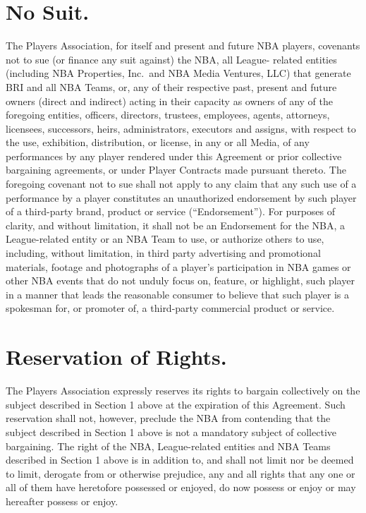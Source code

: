 \documentclass[
]{book}
\begin{document}
\hypertarget{no-suit.}{%
\section{No Suit.}\label{no-suit.}}

The Players Association, for itself and present and future NBA players, covenants not to sue (or finance any suit against) the NBA, all League- related entities (including NBA Properties, Inc.~and NBA Media Ventures, LLC) that generate BRI and all NBA Teams, or, any of their respective past, present and future owners (direct and indirect) acting in their capacity as owners of any of the foregoing entities, officers, directors, trustees, employees, agents, attorneys, licensees, successors, heirs, administrators, executors and assigns, with respect to the use, exhibition, distribution, or license, in any or all Media, of any performances by any player rendered under this Agreement or prior collective bargaining agreements, or under Player Contracts made pursuant thereto. The foregoing covenant not to sue shall not apply to any claim that any such use of a performance by a player constitutes an unauthorized endorsement by such player of a third-party brand, product or service (``Endorsement''). For purposes of clarity, and without limitation, it shall not be an Endorsement for the NBA, a League-related entity or an NBA Team to use, or authorize others to use, including, without limitation, in third party advertising and promotional materials, footage and photographs of a player's participation in NBA games or other NBA events that do not unduly focus on, feature, or highlight, such player in a manner that leads the reasonable consumer to believe that such player is a spokesman for, or promoter of, a third-party commercial product or service.

\hypertarget{reservation-of-rights.}{%
\section{Reservation of Rights.}\label{reservation-of-rights.}}

The Players Association expressly reserves its rights to bargain collectively on the subject described in Section 1 above at the expiration of this Agreement. Such reservation shall not, however, preclude the NBA from contending that the subject described in Section 1 above is not a mandatory subject of collective bargaining. The right of the NBA, League-related entities and NBA Teams described in Section 1 above is in addition to, and shall not limit nor be deemed to limit, derogate from or otherwise prejudice, any and all rights that any one or all of them have heretofore possessed or enjoyed, do now possess or enjoy or may hereafter possess or enjoy.
\end{document}
